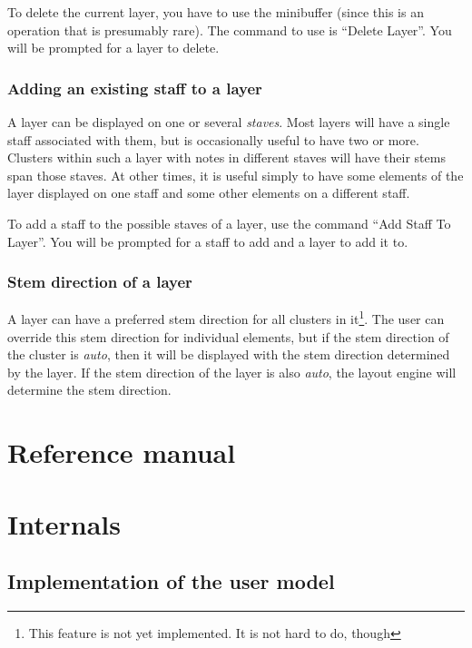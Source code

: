 \documentclass[11pt]{book}
\def\unimp#1{\footnote{This feature is not yet implemented.  #1}}
\def\command#1{``#1''}
\def\inputtex#1{}
\begin{document}
To delete the current layer, you have to use the minibuffer (since
this is an operation that is presumably rare).  The command to use is
\command{Delete Layer}. You will be prompted for a layer to delete. 

\section{Adding an existing staff to a layer}

A layer can be displayed on one or several \emph{staves}.  Most layers
will have a single staff associated with them, but is occasionally
useful to have two or more.  Clusters within such a layer with notes
in different staves will have their stems span those staves.  At other
times, it is useful simply to have some elements of the layer
displayed on one staff and some other elements on a different
staff.

To add a staff to the possible staves of a layer, use the command
\command{Add Staff To Layer}.  You will be prompted for a staff to add
and a layer to add it to.  

\section{Stem direction of a layer}

A layer can have a preferred stem direction for all clusters in
it\unimp{It is not hard to do, though}.  The user can override this
stem direction for individual elements, but if the stem direction of
the cluster is \emph{auto}, then it will
be displayed with the stem direction determined by the layer.  If the
stem direction of the layer is also \emph{auto}, the layout engine
will determine the stem direction. 

\part{Reference manual}
\inputtex{model.tex}
\inputtex{commands.tex}

\part{Internals}

\chapter{Implementation of the user model}
\end{document}
